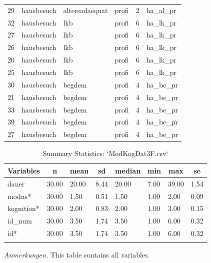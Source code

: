 \documentclass[
  doc,floatsintext]{apa6}
\begin{document}
\begin{table}[tbp]
\begin{center}
\begin{threeparttable}
\begin{tabular}{llllll}
29 & hausbesuch & altersadaequat & profi & 2 & ha\_al\_pr\\
32 & hausbesuch & lkb & profi & 6 & ha\_lk\_pr\\
27 & hausbesuch & lkb & profi & 6 & ha\_lk\_pr\\
26 & hausbesuch & lkb & profi & 6 & ha\_lk\_pr\\
20 & hausbesuch & lkb & profi & 6 & ha\_lk\_pr\\
25 & hausbesuch & lkb & profi & 6 & ha\_lk\_pr\\
30 & hausbesuch & begdem & profi & 4 & ha\_be\_pr\\
21 & hausbesuch & begdem & profi & 4 & ha\_be\_pr\\
33 & hausbesuch & begdem & profi & 4 & ha\_be\_pr\\
39 & hausbesuch & begdem & profi & 4 & ha\_be\_pr\\
27 & hausbesuch & begdem & profi & 4 & ha\_be\_pr\\
\bottomrule
\end{tabular}

\end{threeparttable}
\end{center}

\end{table}

\begin{table}[tbp]

\begin{center}
\begin{threeparttable}

\caption{\label{tab:tabsumstat3}Summary Statistics: `ModKogDat3F.csv`}

\begin{tabular}{llllllll}
\toprule
Variables & \multicolumn{1}{c}{n} & \multicolumn{1}{c}{mean} & \multicolumn{1}{c}{sd} & \multicolumn{1}{c}{median} & \multicolumn{1}{c}{min} & \multicolumn{1}{c}{max} & \multicolumn{1}{c}{se}\\
\midrule
dauer & 30.00 & 20.00 & 8.44 & 20.00 & 7.00 & 39.00 & 1.54\\
modus* & 30.00 & 1.50 & 0.51 & 1.50 & 1.00 & 2.00 & 0.09\\
kognition* & 30.00 & 2.00 & 0.83 & 2.00 & 1.00 & 3.00 & 0.15\\
id\_num & 30.00 & 3.50 & 1.74 & 3.50 & 1.00 & 6.00 & 0.32\\
id* & 30.00 & 3.50 & 1.74 & 3.50 & 1.00 & 6.00 & 0.32\\
\bottomrule
\addlinespace
\end{tabular}

\begin{tablenotes}[para]
\normalsize{\textit{Anmerkungen.} This table contains all variables.}
\end{tablenotes}

\end{threeparttable}
\end{center}

\end{table}
\end{document}
